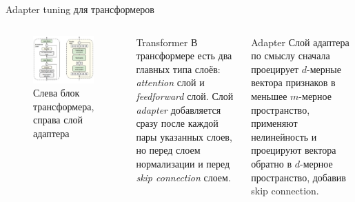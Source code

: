 \documentclass[9pt]{beamer}
\begin{document}
\begin{frame}{Adapter tuning для трансформеров}

    \begin{columns}
         \begin{figure}
            \caption{Слева блок трансформера, справа слой адаптера}
            \label{adapter:block}
            \includegraphics[scale=0.5]{images/adapter_1.jpg}
        \end{figure}
         \begin{block}{Transformer}
            В трансформере есть два главных типа слоёв: \textit{attention} слой и \textit{feedforward} слой. Слой \textit{adapter} добавляется сразу после каждой пары указанных слоев, но перед слоем нормализации и перед \textit{skip connection} слоем.
        \end{block} \begin{block}{Adapter}
            Слой адаптера по смыслу сначала проецирует $d$-мерные вектора признаков в меньшее $m$-мерное пространство, применяют нелинейность и проецируют вектора обратно в $d$-мерное пространство, добавив skip connection.
        \end{block}
    \end{columns}

\end{frame}
\end{document}
